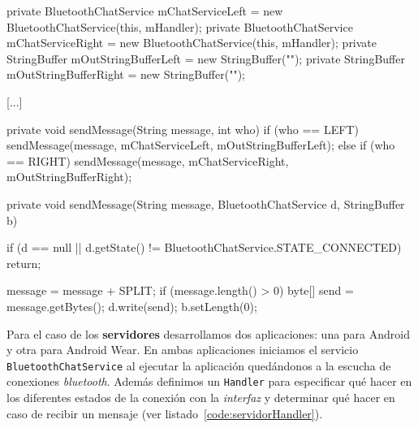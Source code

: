 \begin{listing}[
  float=ht,
  language = java,
  caption  = {Métodos utilizados para enviar mensajes por bluetooth haciendo uso de la clase
               \texttt{BluetoothChatServide}},
  label    = code:sendMessage]
private BluetoothChatService mChatServiceLeft = 
    new BluetoothChatService(this, mHandler);
private BluetoothChatService mChatServiceRight =
    new BluetoothChatService(this, mHandler);
private StringBuffer mOutStringBufferLeft = new StringBuffer("");
private StringBuffer mOutStringBufferRight = new StringBuffer("");

[...]

private void sendMessage(String message, int who) {
    if (who == LEFT) {
      sendMessage(message, mChatServiceLeft, mOutStringBufferLeft);
    } else if (who == RIGHT) {
      sendMessage(message, mChatServiceRight, mOutStringBufferRight);
    }
}

private void sendMessage(String message, BluetoothChatService d, StringBuffer b) {
    if (d == null || d.getState() != BluetoothChatService.STATE_CONNECTED) {
        return;
    }
    	
    message = message + SPLIT;
    if (message.length() > 0) {
        byte[] send = message.getBytes();
        d.write(send);
        b.setLength(0);
    }
}
\end{listing}

Para el caso de los \textbf{servidores} desarrollamos dos aplicaciones: una para Android y otra para
Android Wear. En ambas aplicaciones iniciamos el servicio \texttt{BluetoothChatService} al ejecutar
la aplicación quedándonos a la escucha de conexiones \emph{bluetooth}. Además definimos un
\texttt{Handler} para especificar qué hacer en los diferentes estados de la conexión con la
\emph{interfaz} y determinar qué hacer en caso de recibir un mensaje (ver
listado~\ref{code:servidorHandler}).

